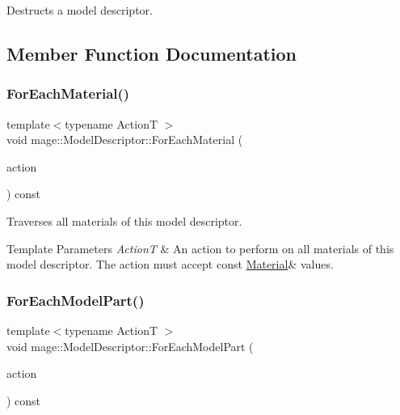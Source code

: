 Destructs a model descriptor. 

\subsection{Member Function Documentation}
\hypertarget{classmage_1_1_model_descriptor_ac4723e18238b0d6ac3c54168b8e9a09f}{}\label{classmage_1_1_model_descriptor_ac4723e18238b0d6ac3c54168b8e9a09f} 
\subsubsection{\texorpdfstring{For\+Each\+Material()}{ForEachMaterial()}}
{\footnotesize\ttfamily template$<$typename ActionT $>$ \\
void mage\+::\+Model\+Descriptor\+::\+For\+Each\+Material (\begin{DoxyParamCaption}\item[{ActionT}]{action }\end{DoxyParamCaption}) const}

Traverses all materials of this model descriptor.


\begin{DoxyTemplParams}{Template Parameters}
{\em ActionT} & An action to perform on all materials of this model descriptor. The action must accept {\ttfamily const} {\ttfamily \hyperlink{structmage_1_1_material}{Material}\&} values. \\
\hline
\end{DoxyTemplParams}
\hypertarget{classmage_1_1_model_descriptor_a1d61699788385cf29726fac0067bcb5c}{}\label{classmage_1_1_model_descriptor_a1d61699788385cf29726fac0067bcb5c} 
\subsubsection{\texorpdfstring{For\+Each\+Model\+Part()}{ForEachModelPart()}}
{\footnotesize\ttfamily template$<$typename ActionT $>$ \\
void mage\+::\+Model\+Descriptor\+::\+For\+Each\+Model\+Part (\begin{DoxyParamCaption}\item[{ActionT}]{action }\end{DoxyParamCaption}) const}

